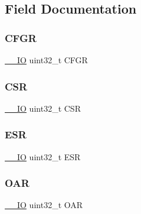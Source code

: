 \subsection{Field Documentation}
\mbox{\label{struct_c_e_c___type_def_a26f1e746ccbf9c9f67e7c60e61085ec1}} 
\subsubsection{\texorpdfstring{CFGR}{CFGR}}
{\footnotesize\ttfamily \mbox{\hyperlink{core__sc300_8h_aec43007d9998a0a0e01faede4133d6be}{\+\_\+\+\_\+\+IO}} uint32\+\_\+t C\+F\+GR}

\mbox{\label{struct_c_e_c___type_def_a876dd0a8546697065f406b7543e27af2}} 
\subsubsection{\texorpdfstring{CSR}{CSR}}
{\footnotesize\ttfamily \mbox{\hyperlink{core__sc300_8h_aec43007d9998a0a0e01faede4133d6be}{\+\_\+\+\_\+\+IO}} uint32\+\_\+t C\+SR}

\mbox{\label{struct_c_e_c___type_def_a2b39f943954e0e7d177b511d9074a0b7}} 
\subsubsection{\texorpdfstring{ESR}{ESR}}
{\footnotesize\ttfamily \mbox{\hyperlink{core__sc300_8h_aec43007d9998a0a0e01faede4133d6be}{\+\_\+\+\_\+\+IO}} uint32\+\_\+t E\+SR}

\mbox{\label{struct_c_e_c___type_def_a117fc6b39bb86cb996234f8ff80414ed}} 
\subsubsection{\texorpdfstring{OAR}{OAR}}
{\footnotesize\ttfamily \mbox{\hyperlink{core__sc300_8h_aec43007d9998a0a0e01faede4133d6be}{\+\_\+\+\_\+\+IO}} uint32\+\_\+t O\+AR}

